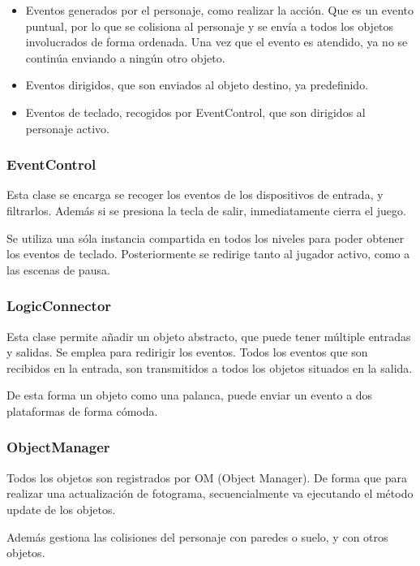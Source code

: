 \documentclass[11pt,a4paper]{article}
\begin{document}
\begin{itemize}
\item Eventos generados por el personaje, como realizar la acción. Que es un 
evento puntual, por lo que se colisiona al personaje y se envía a todos los 
objetos involucrados de forma ordenada. Una vez que el evento es atendido, ya no 
se continúa enviando a ningún otro objeto.

\item Eventos dirigidos, que son enviados al objeto destino, ya predefinido.

\item Eventos de teclado, recogidos por EventControl, que son dirigidos al 
personaje activo.
\end{itemize}

\subsubsection{EventControl}
Esta clase se encarga se recoger los eventos de los dispositivos de entrada, y 
filtrarlos. Además si se presiona la tecla de salir, inmediatamente cierra el 
juego.

Se utiliza una sóla instancia compartida en todos los niveles para poder obtener 
los eventos de teclado. Posteriormente se redirige tanto al jugador activo, 
como a las escenas de pausa.

\subsubsection{LogicConnector}
Esta clase permite añadir un objeto abstracto, que puede tener múltiple entradas 
y salidas. Se emplea para redirigir los eventos. Todos los eventos que son 
recibidos en la entrada, son transmitidos a todos los objetos situados en la 
salida.

De esta forma un objeto como una palanca, puede enviar un evento a dos 
plataformas de forma cómoda.

\subsubsection{ObjectManager}

Todos los objetos son registrados por OM (Object Manager). De forma que para 
realizar una actualización de fotograma, secuencialmente va ejecutando el método 
update de los objetos.

Además gestiona las colisiones del personaje con paredes o suelo, y con otros 
objetos.
\end{document}
